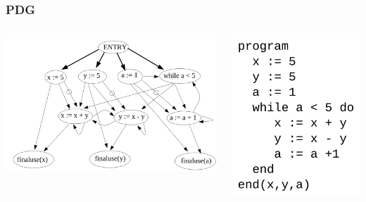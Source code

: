 \documentclass[10pt]{beamer}
\begin{document}
\begin{frame}\frametitle{PDG}
	\begin{columns}[C]
		\includegraphics[scale=0.4]{pdg_example.png}
		
		
		\centering
		\includegraphics[scale=0.3]{pdg_example2.png}
		
	\end{columns}
\end{frame}
\end{document}
